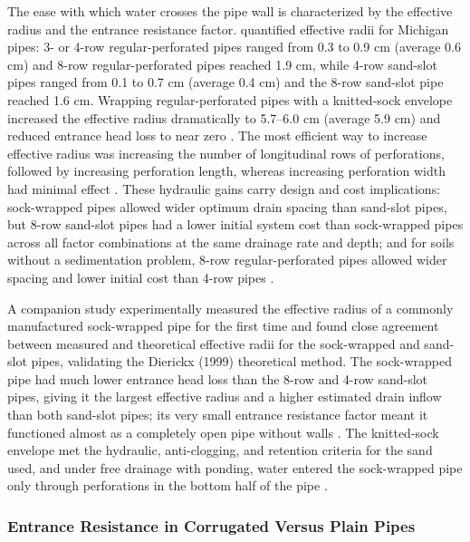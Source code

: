 The ease with which water crosses the pipe wall is characterized by the effective radius
and the entrance resistance factor. \textcite{Ghane2022b} quantified effective radii for
Michigan pipes: 3- or 4-row regular-perforated pipes ranged from 0.3 to 0.9 cm (average
0.6 cm) and 8-row regular-perforated pipes reached 1.9 cm, while 4-row sand-slot pipes
ranged from 0.1 to 0.7 cm (average 0.4 cm) and the 8-row sand-slot pipe reached 1.6 cm.
Wrapping regular-perforated pipes with a knitted-sock envelope increased the effective
radius dramatically to 5.7--6.0 cm (average 5.9 cm) and reduced entrance head loss to near
zero \parencite{Ghane2022b}. The most efficient way to increase effective radius was
increasing the number of longitudinal rows of perforations, followed by increasing
perforation length, whereas increasing perforation width had minimal effect
\parencite{Ghane2022b}. These hydraulic gains carry design and cost implications:
sock-wrapped pipes allowed wider optimum drain spacing than sand-slot pipes, but 8-row
sand-slot pipes had a lower initial system cost than sock-wrapped pipes across all factor
combinations at the same drainage rate and depth; and for soils without a sedimentation
problem, 8-row regular-perforated pipes allowed wider spacing and lower initial cost than
4-row pipes \parencite{Ghane2022b}.

A companion study \parencite{Ghane2022} experimentally measured the effective radius of a
commonly manufactured sock-wrapped pipe for the first time and found close agreement
between measured and theoretical effective radii for the sock-wrapped and sand-slot pipes,
validating the Dierickx (1999) theoretical method. The sock-wrapped pipe had much lower
entrance head loss than the 8-row and 4-row sand-slot pipes, giving it the largest
effective radius and a higher estimated drain inflow than both sand-slot pipes; its very
small entrance resistance factor meant it functioned almost as a completely open pipe
without walls \parencite{Ghane2022}. The knitted-sock envelope met the hydraulic,
anti-clogging, and retention criteria for the sand used, and under free drainage with
ponding, water entered the sock-wrapped pipe only through perforations in the bottom half
of the pipe \parencite{Ghane2022}.

\subsubsection{Entrance Resistance in Corrugated Versus Plain Pipes}


